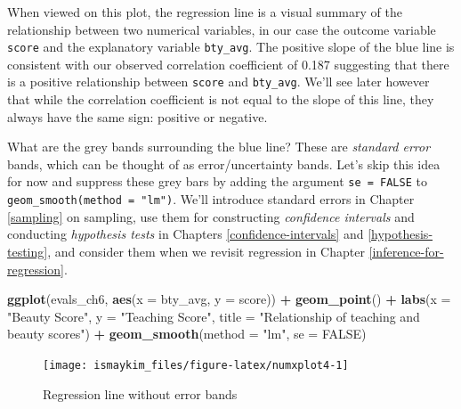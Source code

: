 \documentclass[12pt, krantz2,]{krantz}
\makeatletter
\newenvironment{Shaded}{\begin{snugshade}}{\end{snugshade}}
\newcommand{\DataTypeTok}[1]{\textcolor[rgb]{0.27,0.27,0.27}{#1}}
\newcommand{\KeywordTok}[1]{\textcolor[rgb]{0.27,0.27,0.27}{\textbf{#1}}}
\newcommand{\NormalTok}[1]{#1}
\newcommand{\OperatorTok}[1]{\textcolor[rgb]{0.43,0.43,0.43}{\textbf{#1}}}
\newcommand{\OtherTok}[1]{\textcolor[rgb]{0.37,0.37,0.37}{#1}}
\newcommand{\StringTok}[1]{\textcolor[rgb]{0.5,0.5,0.5}{#1}}
\newenvironment{kframe}{%
\medskip{}
\setlength{\fboxsep}{.8em}
 \def\at@end@of@kframe{}%
 \ifinner\ifhmode%
  \def\at@end@of@kframe{\end{minipage}}%
  \begin{minipage}{\columnwidth}%
 \fi\fi%
 \def\FrameCommand##1{\hskip\@totalleftmargin \hskip-\fboxsep
 \colorbox{shadecolor}{##1}\hskip-\fboxsep
     \hskip-\linewidth \hskip-\@totalleftmargin \hskip\columnwidth}%
 \MakeFramed {\advance\hsize-\width
   \@totalleftmargin\z@ \linewidth\hsize
   \@setminipage}}%
 {\par\unskip\endMakeFramed%
 \at@end@of@kframe}
\renewenvironment{Shaded}{\begin{kframe}}{\end{kframe}}
\makeatother
\begin{document}
When viewed on this plot, the regression line is a visual summary of the relationship between two numerical variables, in our case the outcome variable \texttt{score} and the explanatory variable \texttt{bty\_avg}. The positive slope of the blue line is consistent with our observed correlation coefficient of 0.187 suggesting that there is a positive relationship between \texttt{score} and \texttt{bty\_avg}. We'll see later however that while the correlation coefficient is not equal to the slope of this line, they always have the same sign: positive or negative.

What are the grey bands surrounding the blue line? These are \emph{standard error} bands, which can be thought of as error/uncertainty bands. Let's skip this idea for now and suppress these grey bars by adding the argument \texttt{se\ =\ FALSE} to \texttt{geom\_smooth(method\ =\ "lm")}. We'll introduce standard errors in Chapter \ref{sampling} on sampling, use them for constructing \emph{confidence intervals} and conducting \emph{hypothesis tests} in Chapters \ref{confidence-intervals} and \ref{hypothesis-testing}, and consider them when we revisit regression in Chapter \ref{inference-for-regression}.

\begin{Shaded}
\begin{Highlighting}[]
\KeywordTok{ggplot}\NormalTok{(evals_ch6, }\KeywordTok{aes}\NormalTok{(}\DataTypeTok{x =}\NormalTok{ bty_avg, }\DataTypeTok{y =}\NormalTok{ score)) }\OperatorTok{+}
\StringTok{  }\KeywordTok{geom_point}\NormalTok{() }\OperatorTok{+}
\StringTok{  }\KeywordTok{labs}\NormalTok{(}\DataTypeTok{x =} \StringTok{"Beauty Score"}\NormalTok{, }\DataTypeTok{y =} \StringTok{"Teaching Score"}\NormalTok{, }
       \DataTypeTok{title =} \StringTok{"Relationship of teaching and beauty scores"}\NormalTok{) }\OperatorTok{+}
\StringTok{  }\KeywordTok{geom_smooth}\NormalTok{(}\DataTypeTok{method =} \StringTok{"lm"}\NormalTok{, }\DataTypeTok{se =} \OtherTok{FALSE}\NormalTok{)}
\end{Highlighting}
\end{Shaded}

\begin{figure}

{\centering \texttt{[image: ismaykim\_files/figure-latex/numxplot4-1]} 

}

\caption{Regression line without error bands}\label{fig:numxplot4}
\end{figure}
\end{document}
